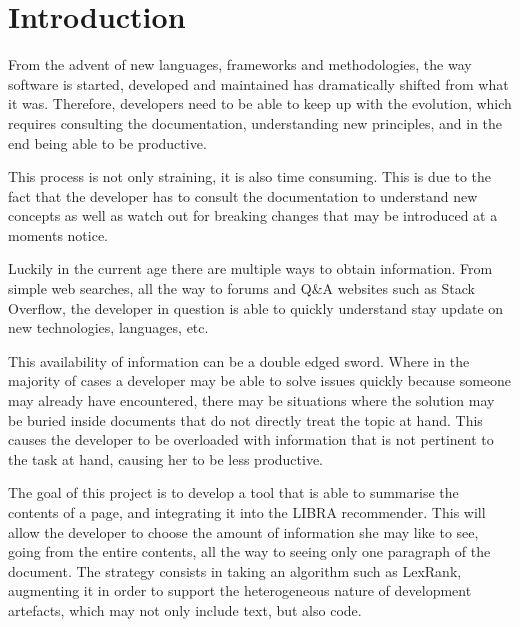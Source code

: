 \section{Introduction}\label{sec:introduction}
From the advent of new languages, frameworks and methodologies, the way software is started, developed and maintained has dramatically shifted from what it was. Therefore, developers need to be able to keep up with the evolution, which requires consulting the documentation, understanding new principles, and in the end being able to be productive. 

This process is not only straining, it is also time consuming. This is due to the fact that the developer has to consult the documentation to understand new concepts as well as watch out for breaking changes that may be introduced at a moments notice. 

Luckily in the current age there are multiple ways to obtain information. From simple web searches, all the way to forums and Q\&A websites such as Stack Overflow, the developer in question is able to quickly understand stay update on new technologies, languages, etc. %

This availability of information can be a double edged sword. Where in the majority of cases a developer may be able to solve issues quickly because someone may already have encountered, there may be situations where the solution may be buried inside documents that do not directly treat the topic at hand. This causes the developer to be overloaded with information that is not pertinent to the task at hand, causing her to be less productive.

The goal of this project is to develop a tool that is able to summarise the contents of a page, and integrating it into the LIBRA\cite{Ponz2017a} recommender. This will allow the developer to choose the amount of information she may like to see, going from the entire contents, all the way to seeing only one paragraph of the document. The strategy consists in taking an algorithm such as LexRank, augmenting it in order to support the heterogeneous nature of development artefacts, which may not only include text, but also code.


